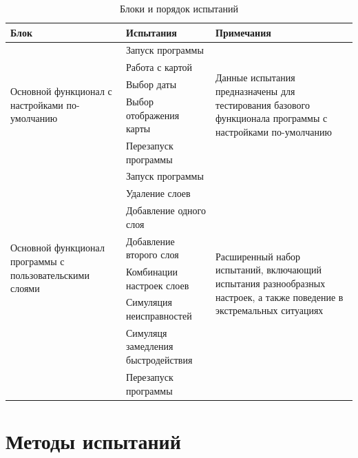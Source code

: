 \documentclass[a4paper, 12pt]{article}
\begin{document}
	\begin{table}[h]
		\setlength{\extrarowheight}{7pt}
		\begin{tabularx}
			{\textwidth}{|X|X|X|} \hline \textbf{Блок} & \textbf{Испытания} & \textbf{Примечания} \\ \hline \multirow{5}{\hsize}{Основной функционал с настройками по-умолчанию}
			& Запуск программы & \multirow{5}{\hsize}{Данные испытания предназначены для тестирования базового функционала программы с настройками по-умолчанию}
			\\ \cline{2-2} & Работа с картой & \\ \cline{2-2} & Выбор даты & \\ \cline{2-2} & Выбор отображения карты & \\
			\cline{2-2} & Перезапуск программы & \\ \hline

			\multirow{7}{\hsize}{Основной функционал программы с пользовательскими слоями} & Запуск программы & \multirow{8}{\hsize}{Расширенный набор испытаний, включающий испытания разнообразных настроек, а также поведение в экстремальных ситуациях}
			\\ \cline{2-2} & Удаление слоев & \\ \cline{2-2} & Добавление одного слоя & \\ \cline{2-2} & Добавление второго слоя & \\ \cline{2-2} & Комбинации настроек слоев & \\ \cline{2-2} & Симуляция неисправностей & \\ \cline{2-2} &
			Симуляця замедления быстродействия & \\ \cline{2-2} & Перезапуск программы & \\ \hline

		\end{tabularx}
		\caption{Блоки и порядок испытаний}
	\end{table}
	\section{Методы испытаний}
	\label{section:6}
\end{document}
